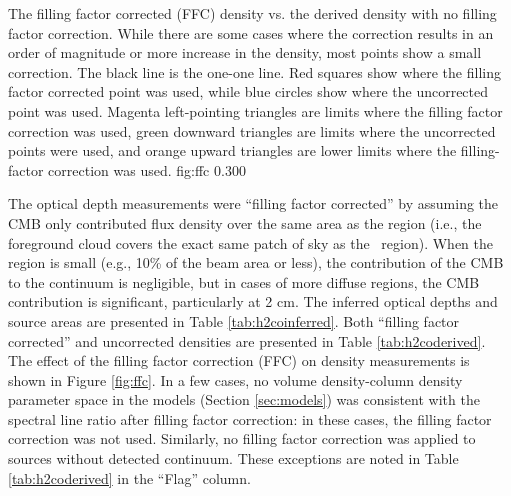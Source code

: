 
{The filling factor corrected (FFC) density vs. the derived density with no
filling factor correction.  While there are some cases where the correction
results in an order of magnitude or more increase in the density, most points
show a small correction.  The black line is the one-one line.  Red squares
show where the filling factor corrected point was used, while blue circles show
where the uncorrected point was used.  Magenta left-pointing triangles are
limits where the filling factor correction was used, green downward triangles
are limits where the uncorrected points were used, and orange upward triangles
are lower limits where the filling-factor correction was used.}
{fig:ffc}
{0.30}{0}

The optical depth measurements were ``filling factor corrected'' by assuming
the CMB only contributed flux density over the same area as the 
region (i.e., the foreground cloud covers the exact same patch of sky as the
\uchii\ region).  When the  region is small (e.g., 10\% of the beam
area or less), the contribution of the CMB to the continuum is negligible, but
in cases of more diffuse  regions, the CMB contribution is
significant, particularly at 2 cm.  The inferred optical depths and source areas
are presented in Table \ref{tab:h2coinferred}.  Both ``filling factor corrected'' and
uncorrected densities are presented in Table \ref{tab:h2coderived}.  The effect
of the filling factor correction (FFC) on density measurements is shown in
Figure \ref{fig:ffc}.  In a few cases, no volume density-column density
parameter space in the models (Section \ref{sec:models}) was consistent with
the spectral line ratio after filling factor correction: in these cases, the
filling factor correction was not used.  Similarly, no filling factor
correction was applied to sources without detected continuum.  These exceptions
are noted in Table \ref{tab:h2coderived} in the ``Flag'' column.

